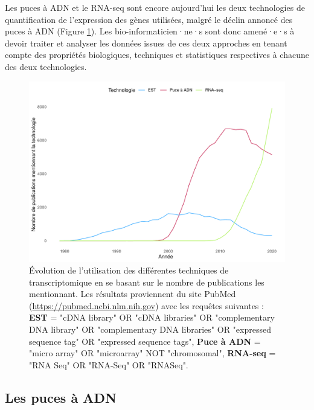 Les puces à \acrshort{ADN} et le \acrshort{RNA-seq} sont encore aujourd'hui les deux technologies de quantification de l'expression des gènes utilisées, malgré le déclin annoncé des puces à \acrshort{ADN} (Figure \ref{fig:intro_count_by_year_rnaseq_microarray_est}). Les bio-informaticien·ne·s sont donc amené·e·s à devoir traiter et analyser les données issues de ces deux approches en tenant compte des propriétés biologiques, techniques et statistiques respectives à chacune des deux technologies.

\begin{figure}[ht]
    \centering
    \includegraphics[width=\textwidth]{img/intro/2_meth_transcripto/intro_2_count_by_year_rnaseq_microarray_est.pdf}
    \caption[Évolution de l'utilisation des différentes techniques de transcriptomique en se basant sur le nombre de publications les mentionnant]{Évolution de l'utilisation des différentes techniques de transcriptomique en se basant sur le nombre de publications les mentionnant. Les résultats proviennent du site PubMed (\url{https://pubmed.ncbi.nlm.nih.gov}) avec les requêtes suivantes : \textbf{EST} = "cDNA library" OR "cDNA libraries" OR "complementary DNA library" OR "complementary DNA libraries" OR "expressed sequence tag" OR "expressed sequence tags", \textbf{Puce à ADN} = "micro array" OR "microarray" NOT "chromosomal", \textbf{RNA-seq} = "RNA Seq" OR "RNA-Seq" OR "RNASeq".}
    \label{fig:intro_count_by_year_rnaseq_microarray_est}
\end{figure}


\subsection{Les puces à ADN}

